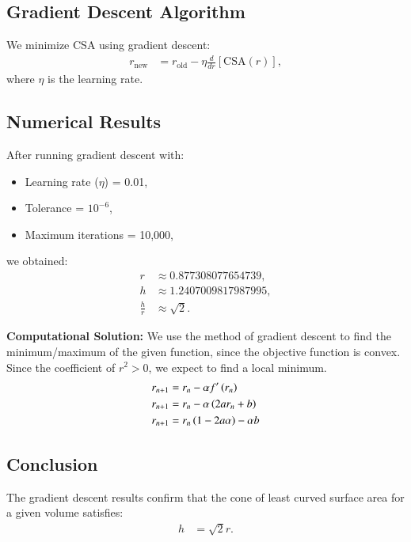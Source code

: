 \documentclass[article]{IEEEtran}
\numberwithin{figure}{enumi}
\begin{document}
\subsection*{Gradient Descent Algorithm}

We minimize CSA using gradient descent:
\begin{align}
r_{\text{new}} &= r_{\text{old}} - \eta \frac{d}{dr}[\text{CSA}(r)],
\end{align}
where \(\eta\) is the learning rate.

\subsection*{Numerical Results}

After running gradient descent with:
\begin{itemize}
    \item Learning rate (\(\eta\)) = 0.01,
    \item Tolerance = \(10^{-6}\),
    \item Maximum iterations = 10,000,
\end{itemize}
we obtained:
\begin{align}
r &\approx 0.877308077654739, \\
h &\approx 1.2407009817987995, \\
\frac{h}{r} &\approx \sqrt{2}.
\end{align}


    \item \textbf{Computational Solution:}
    We use the method of gradient descent to find the minimum/maximum of the given function, since the objective function is convex. Since the coefficient of $r^2 > 0$, we expect to find a local minimum.
    \begin{align}
        r_{n + 1} &= r_n - \alpha f^{\prime}\left(r_n\right)\\
        r_{n + 1} &= r_n - \alpha \left(2ar_n + b\right)\\
        r_{n + 1} &= r_n \left(1 - 2a\alpha\right) - \alpha b \label{z}
    \end{align}
    \subsection*{Conclusion}

The gradient descent results confirm that the cone of least curved surface area for a given volume satisfies:
\begin{align}
h &= \sqrt{2}r.
\end{align}
\end{document}
